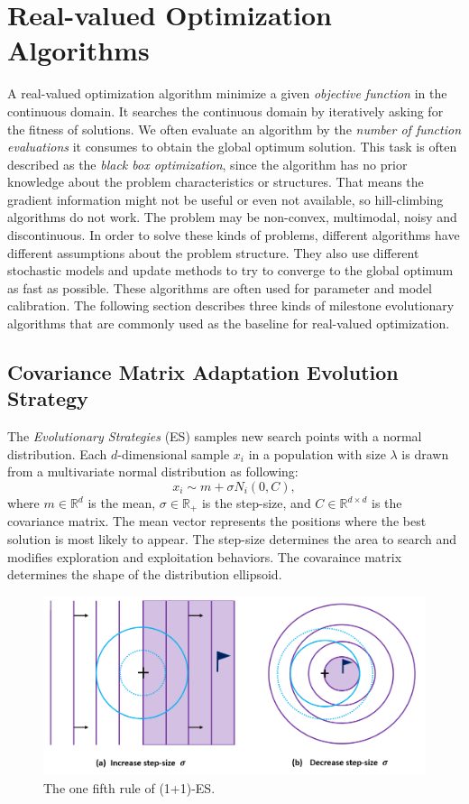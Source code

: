 \chapter{Real-valued Optimization Algorithms}
\label{chapter:algos}

A real-valued optimization algorithm minimize a given \textit{objective function} in the continuous domain.
It searches the continuous domain by iteratively asking for the fitness of solutions.
We often evaluate an algorithm by the \textit{number of function evaluations} it consumes to obtain the global optimum solution.
This task is often described as the \textit{black box optimization},
since the algorithm has no prior knowledge about the problem characteristics or structures.
That means the gradient information might not be useful or even not available, so hill-climbing algorithms do not work.
The problem may be non-convex, multimodal, noisy and discontinuous.
In order to solve these kinds of problems, different algorithms have different assumptions about the problem structure.
They also use different stochastic models and update methods to try to converge to the global optimum as fast as possible.
These algorithms are often used for parameter and model calibration.  
The following section describes three kinds of milestone evolutionary algorithms 
that are commonly used as the baseline for real-valued optimization.


\section{Covariance Matrix Adaptation Evolution Strategy}
The \textit{Evolutionary Strategies} (ES) samples new search points with a normal distribution.
Each $d$-dimensional sample $x_i$ in a population with size $\lambda$ is drawn from a multivariate normal distribution as following:  
\begin{displaymath}
x_i \sim m + \sigma N_i(0,C),
\end{displaymath}
where $m \in \mathbb{R}^d$ is the mean, $\sigma \in \mathbb{R}_+$ is the step-size, and $C \in \mathbb{R}^{d \times d}$ is the covariance matrix.
The mean vector represents the positions where the best solution is most likely to appear.
The step-size determines the area to search and modifies exploration and exploitation behaviors.
The covaraince matrix determines the shape of the distribution ellipsoid.

\begin{figure}
\centering
\includegraphics[width=\textwidth]{one_plus_one_ES}
\caption{The one fifth rule of (1+1)-ES.}\label{fig:one_plus_one_ES}
\end{figure}

